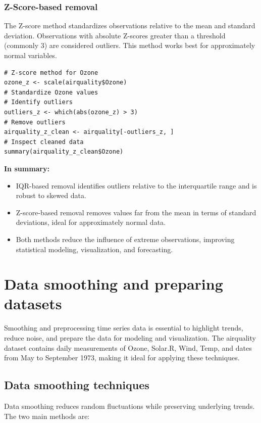 \documentclass[12pt,a4paper]{article}
\begin{document}
\subsubsection{Z-Score-based removal}

The Z-score method standardizes observations relative to the mean and standard deviation. Observations with absolute Z-scores greater than a threshold (commonly 3) are considered outliers. This method works best for approximately normal variables.

\begin{verbatim}
# Z-score method for Ozone
ozone_z <- scale(airquality$Ozone)
# Standardize Ozone values
# Identify outliers
outliers_z <- which(abs(ozone_z) > 3)
# Remove outliers
airquality_z_clean <- airquality[-outliers_z, ]
# Inspect cleaned data
summary(airquality_z_clean$Ozone)
\end{verbatim}

\textbf{In summary:}
\begin{itemize}
    \item IQR-based removal identifies outliers relative to the interquartile range and is robust to skewed data.
    \item Z-score-based removal removes values far from the mean in terms of standard deviations, ideal for approximately normal data.
    \item Both methods reduce the influence of extreme observations, improving statistical modeling, visualization, and forecasting.
\end{itemize}

\section{Data smoothing and preparing datasets}

Smoothing and preprocessing time series data is essential to highlight trends, reduce noise, and prepare the data for modeling and visualization. The airquality dataset contains daily measurements of Ozone, Solar.R, Wind, Temp, and dates from May to September 1973, making it ideal for applying these techniques.

\subsection{Data smoothing techniques}

Data smoothing reduces random fluctuations while preserving underlying trends. The two main methods are:
\end{document}
